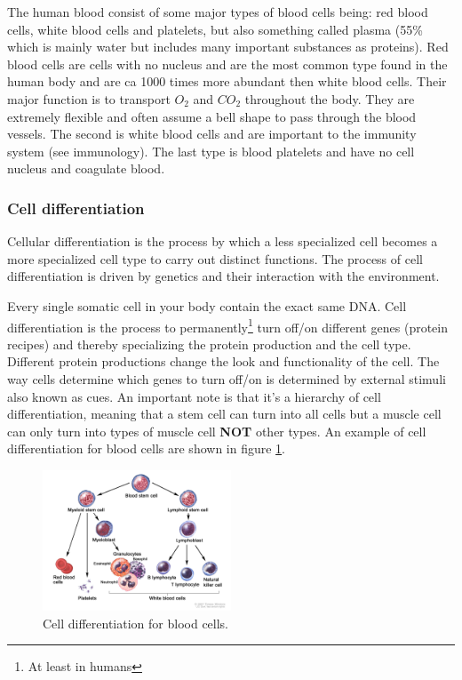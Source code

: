 \documentclass[jmp, amsmath, amssymb, reprint]{article}
\numberwithin{equation}{section}
\begin{document}
\begin{multicols}{2}
The human blood consist of some major types of blood cells being: red blood cells, white blood cells and platelets, but also something called plasma (55\% which is mainly water but includes many important substances as proteins). Red blood cells are cells with no nucleus and are the most common type found in the human body and are ca 1000 times more abundant then white blood cells. Their major function is to transport \(O_2\) and \(CO_2\) throughout the body. They are extremely flexible and often assume a bell shape to pass through the blood vessels. The second is white blood cells and are important to the immunity system (see immunology). The last type is blood platelets and have no cell nucleus and coagulate blood.

\subsubsection{Cell differentiation}

Cellular differentiation is the process by which a less specialized cell becomes a more specialized cell type to carry out distinct functions. The process of cell differentiation is driven by genetics and their interaction with the environment. 

Every single somatic cell in your body contain the exact same DNA. Cell differentiation is the process to permanently\footnote{At least in humans} turn off/on different genes (protein recipes) and thereby specializing the protein production and the cell type. Different protein productions change the look and functionality of the cell. The way cells determine which genes to turn off/on is determined by external stimuli also known as cues. An important note is that it's a hierarchy of cell differentiation, meaning that a stem cell can turn into all cells but a muscle cell can only turn into types of muscle cell \textbf{NOT} other types. An example of cell differentiation for blood cells are shown in figure \ref{fig:cell_differentiation}.

\begin{figure}[H]
	\centering
  	\includegraphics[width=0.50\textwidth]{cell_differentiation}%
	\caption{Cell differentiation for blood cells.}
	\label{fig:cell_differentiation}
\end{figure}

\end{multicols}
\end{document}
